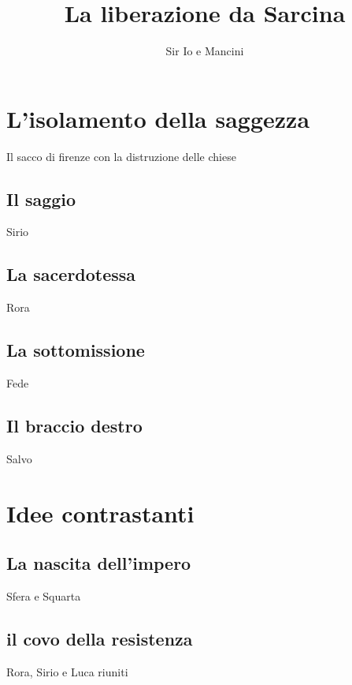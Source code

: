 \documentclass{book}
\title{La liberazione da Sarcina}
\author{Sir Io e Mancini}
\date{}
\begin{document}
\maketitle
\tableofcontents

  
\chapter{L'isolamento della saggezza}
Il sacco di firenze con la distruzione delle chiese
\section{Il saggio}
Sirio
\section{La sacerdotessa}
Rora
\section{La sottomissione}
Fede
\section{Il braccio destro}
Salvo
\chapter{Idee contrastanti}
\section{La nascita dell'impero}
Sfera e Squarta
\section{il covo della resistenza}
Rora, Sirio e Luca riuniti
\end{document}

